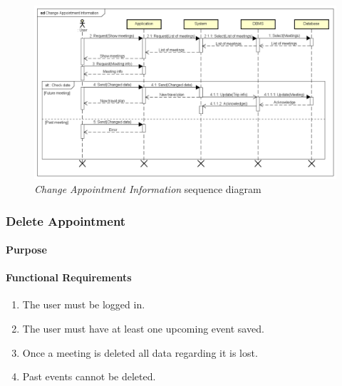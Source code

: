 \begin{figure}
	\includegraphics[width=\textheight, height=\textwidth, keepaspectratio=true]{Img/ChangeAppointmentInformationSQ}
	\caption{\emph{Change Appointment Information} sequence diagram}
	\label{fig:ChangeAppointmentInformationSQ}
\end{figure}

\clearpage
\subsubsection{Delete Appointment}
\paragraph*{Purpose\\}
\paragraph*{Functional Requirements}
\begin{enumerate}[label=R.\arabic*:,resume]
	\item The user must be logged in.
	\item The user must have at least one upcoming event saved.
	\item Once a meeting is deleted all data regarding it is lost.
	\item Past events cannot be deleted.
\end{enumerate}

